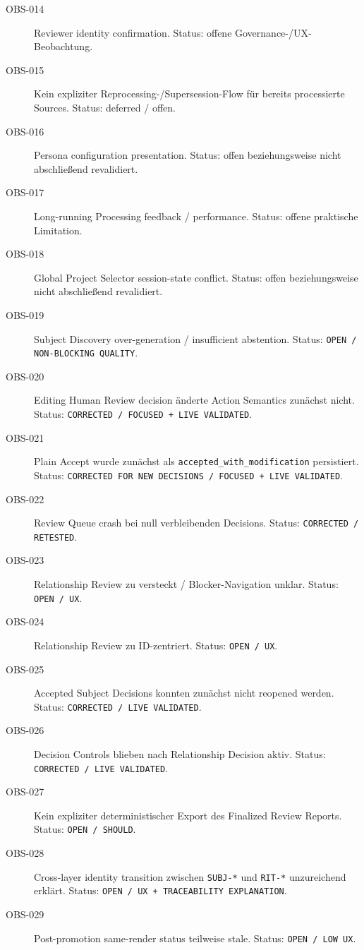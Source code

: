 \begin{description}
    \item[OBS-014] Reviewer identity confirmation. Status: offene Governance-/UX-Beobachtung.
    \item[OBS-015] Kein expliziter Reprocessing-/Supersession-Flow für bereits processierte Sources. Status: deferred / offen.
    \item[OBS-016] Persona configuration presentation. Status: offen beziehungsweise nicht abschließend revalidiert.
    \item[OBS-017] Long-running Processing feedback / performance. Status: offene praktische Limitation.
    \item[OBS-018] Global Project Selector session-state conflict. Status: offen beziehungsweise nicht abschließend revalidiert.
    \item[OBS-019] Subject Discovery over-generation / insufficient abstention. Status: \texttt{OPEN / NON-BLOCKING QUALITY}.
    \item[OBS-020] Editing Human Review decision änderte Action Semantics zunächst nicht. Status: \texttt{CORRECTED / FOCUSED + LIVE VALIDATED}.
    \item[OBS-021] Plain Accept wurde zunächst als \texttt{accepted\_with\_modification} persistiert. Status: \texttt{CORRECTED FOR NEW DECISIONS / FOCUSED + LIVE VALIDATED}.
    \item[OBS-022] Review Queue crash bei null verbleibenden Decisions. Status: \texttt{CORRECTED / RETESTED}.
    \item[OBS-023] Relationship Review zu versteckt / Blocker-Navigation unklar. Status: \texttt{OPEN / UX}.
    \item[OBS-024] Relationship Review zu ID-zentriert. Status: \texttt{OPEN / UX}.
    \item[OBS-025] Accepted Subject Decisions konnten zunächst nicht reopened werden. Status: \texttt{CORRECTED / LIVE VALIDATED}.
    \item[OBS-026] Decision Controls blieben nach Relationship Decision aktiv. Status: \texttt{CORRECTED / LIVE VALIDATED}.
    \item[OBS-027] Kein expliziter deterministischer Export des Finalized Review Reports. Status: \texttt{OPEN / SHOULD}.
    \item[OBS-028] Cross-layer identity transition zwischen \texttt{SUBJ-*} und \texttt{RIT-*} unzureichend erklärt. Status: \texttt{OPEN / UX + TRACEABILITY EXPLANATION}.
    \item[OBS-029] Post-promotion same-render status teilweise stale. Status: \texttt{OPEN / LOW UX}.

\end{description}
